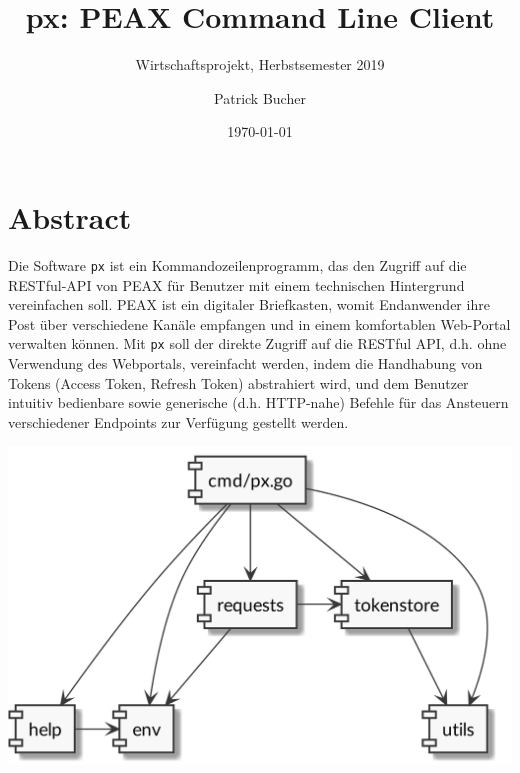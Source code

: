 \author{Patrick Bucher}
\title{px: PEAX Command Line Client}
\subtitle{Wirtschaftsprojekt, Herbstsemester 2019}
\date{\today}
\maketitle
\thispagestyle{empty}

\section*{Abstract}

Die Software \texttt{px} ist ein Kommandozeilenprogramm, das den Zugriff auf die RESTful-API von PEAX für Benutzer mit einem technischen Hintergrund vereinfachen soll. PEAX ist ein digitaler Briefkasten, womit Endanwender ihre Post über verschiedene Kanäle empfangen und in einem komfortablen Web-Portal verwalten können. Mit \texttt{px} soll der direkte Zugriff auf die RESTful API, d.h. ohne Verwendung des Webportals, vereinfacht werden, indem die Handhabung von Tokens (Access Token, Refresh Token) abstrahiert wird, und dem Benutzer intuitiv bedienbare sowie generische (d.h. HTTP-nahe) Befehle für das Ansteuern verschiedener Endpoints zur Verfügung gestellt werden.

\vfill

\begin{center}
    \includegraphics[width=0.7\linewidth]{pics/title.png}
\end{center}
